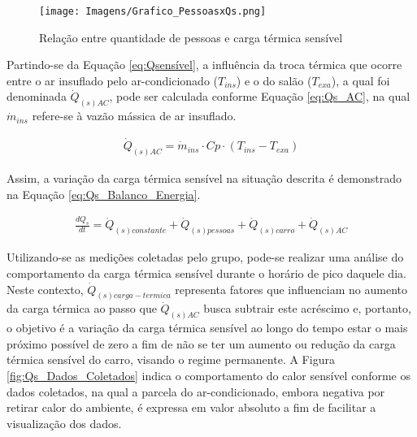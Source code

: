 \documentclass[acronym,symbols,table]{fei}
\begin{document}
\begin{figure}[!htb]
    \centering
    \caption{Relação entre quantidade de pessoas e carga térmica sensível}
    \texttt{[image: Imagens/Grafico\_PessoasxQs.png]}
    \label{fig:Grafico_PessoasxQs}
\end{figure}

Partindo-se da Equação \ref{eq:Qsensível}, a influência da troca térmica que ocorre entre o ar insuflado pelo ar-condicionado ($T_{ins}$) e o do salão ($T_{exa}$), a qual foi denominada $\dot{Q}_{(s)AC}$, pode ser calculada conforme Equação \ref{eq:Qs_AC}, na qual $\dot{m}_{ins}$ refere-se à vazão mássica de ar insuflado.

\begin{equation} \label{eq:Qs_AC}
    \begin{aligned}
    \dot{Q}_{(s)AC}= \dot{m}_{ins} \cdot Cp \cdot (T_{ins}-T_{exa})
    \end{aligned}
\end{equation}

Assim, a variação da carga térmica sensível na situação descrita é demonstrado na Equação \ref{eq:Qs_Balanco_Energia}.

\begin{equation} \label{eq:Qs_Balanco_Energia}
    \begin{aligned}
    \frac{dQ_{s}}{dt}=\dot{Q}_{(s)constante} + \dot{Q}_{(s)pessoas} + \dot{Q}_{(s)carro} + \dot{Q}_{(s)AC}
    \end{aligned}
\end{equation}

Utilizando-se as medições coletadas pelo grupo, pode-se realizar uma análise do comportamento da carga térmica sensível durante o horário de pico daquele dia. Neste contexto,  $\dot{Q}_{(s)carga-termica}$ representa fatores que influenciam no aumento da carga térmica ao passo que $\dot{Q}_{(s)AC}$ busca subtrair este acréscimo e, portanto, o objetivo é a variação da carga térmica sensível ao longo do tempo estar o mais próximo possível de zero a fim de não se ter um aumento ou redução da carga térmica sensível do carro, visando o regime permanente. A Figura \ref{fig:Qs_Dados_Coletados} indica o comportamento do calor sensível conforme os dados coletados, na qual a parcela do ar-condicionado, embora negativa por retirar calor do ambiente, é expressa em valor absoluto a fim de facilitar a visualização dos dados.
\end{document}
